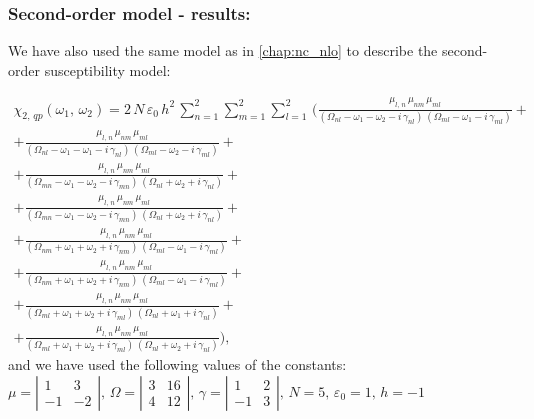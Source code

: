 \documentclass[12pt,twoside,a4paper]{article}
\numberwithin{equation}{subsection}
\numberwithin{figure}{subsection}
\begin{document}
\subsubsection*{Second-order model - results:}

We have also used the same model as in \ref{chap:nc_nlo} to describe the second-order susceptibility model:

\begin{multline} \label{eq:fht_qp2}
  \chi_{2, \,qp}({\omega_{1}}, \,{\omega_{2}}) = 
     2\,N\,\varepsilon_{0}\,h^{2}\,\sum_{n=1}^{2}\sum_{m=1}^{2}\sum_{l=1}^{2}\,
  ( 
      \frac {{\mu_{l,\,n}}\,{\mu_{nm}}\,{\mu_{ml}}}
      {({\Omega_{nl}} - \omega_1 - \omega_2 - i\,{\gamma_{nl}})\,({\Omega_{ml}} - \omega_1 - i\,{\gamma_{ml}})}
+\\ + \frac   {{\mu_{l, \,n}}\,{\mu_{nm}}\,{\mu_{ml}}}
      {({\Omega_{nl}} - \omega_1 - \omega_1 - i\,{\gamma_{nl}})\,({\Omega_{ml}} - \omega_2 - i\,{\gamma_{ml}})}
+\\ + \frac   {{\mu_{l, \,n}}\,{\mu_{nm}}\,{\mu_{ml}}}
      {({\Omega_{mn}} - \omega_1 - \omega_2 - i\,{\gamma_{mn}})\,({\Omega_{nl}} + \omega_2 + i\,{\gamma_{nl}})}
+\\ + \frac{{\mu_{l, \,n }}\,{\mu_{nm}}\,{\mu_{ml}}} 
      {({\Omega_{mn}} - \omega_1 - \omega_2 - i\,{\gamma_{mn}})\,({\Omega_{nl}} + \omega_2 + i\,{\gamma_{nl}})} 
+\\ + \frac   {{\mu_{l, \,n}}\,{\mu_{nm}}\,{\mu_{ml}}}
      {({\Omega_{nm}} + \omega_1 + \omega_2 + i\,{\gamma_{nm}})\,({\Omega_{ml}} - \omega_1 - i\,{\gamma_{ml}})}
+\\ + \frac {{\mu_{l, \,n}}\,{\mu_{ nm}}\,{\mu_{ml}}}
      {({\Omega_{nm}} + \omega_1 + \omega_2 + i\,{\gamma_{nm}})\,({\Omega_{ml}} - \omega_1 - i\,{\gamma_{ml}})} 
+\\ + \frac {{\mu_{l, \,n}}\,{\mu_{nm}}\,{\mu_{ml}}}
      {({\Omega_{ml}} + \omega_1 + \omega_2 + i\,{\gamma_{ml}})\,({\Omega_{nl}} + \omega_1 + i\,{\gamma_{nl}})}
+\\ + \frac {{\mu_{l, \,n}}\,{\mu_{nm}}\,{\mu_{ml}}}
      {({\Omega_{ml}} + \omega_1 + \omega_2 + i\,{\gamma_{ml}})\,({\Omega_{nl}} + \omega_2 + i\,{\gamma_{nl}})}
  )  ,
\end{multline}
and we have used the following values of the constants: \\
$\mu = \left| \begin{array}{cc} 
    1 & 3 \\ -1 & -2 
  \end{array} \right|,\, 
  \Omega = \left| \begin{array}{cc} 
    3 & 16 \\ 4 & 12 
  \end{array} \right|,\,
  \gamma = \left| \begin{array}{cc} 
  1 & 2 \\ -1 & 3
  \end{array} \right|,\, N=5,\, {\varepsilon_{0}}=1,\,h= - 1$
\end{document}
